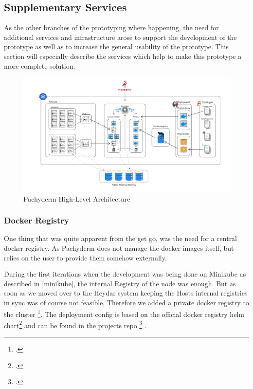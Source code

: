 \subsection{Supplementary Services}

As the other branches of the prototyping where happening, the need for additional services and infrastructure arose to 
support the development of the prototype as well as to increase the general usability of the prototype. 
This section will especially describe the services which help to make this prototype a more complete solution.


\begin{figure}[htb]
    \centering
    \includegraphics[width=17cm]{graphics/pachykouda_complete.png}
    \caption[Pachyderm High-Level Architecture]{Pachyderm High-Level Architecture}
    \label{abb:pachyderm_complete}
\end{figure}

\subsubsection{Docker Registry}

One thing that was quite apparent from the get go, was the need for a central docker registry.
As Pachyderm does not manage the docker images itself, but relies on the user to provide them somehow externally.

During the first iterations when the development was being done on Minikube as described in \ref{minikube}, the internal Registry 
of the node was enough.
But as soon as we moved over to the Heydar system keeping the Hosts internal registries in sync was of course not feasible,
Therefore we added a private docker registry to the cluster \footcite{kumarHowSetupPrivate2020}.
The deployment config is based on the official docker registry helm chart\footcite{Dockerregistry10Phntom} and can be found in the projects repo \footcite{dokcer_registry} .

